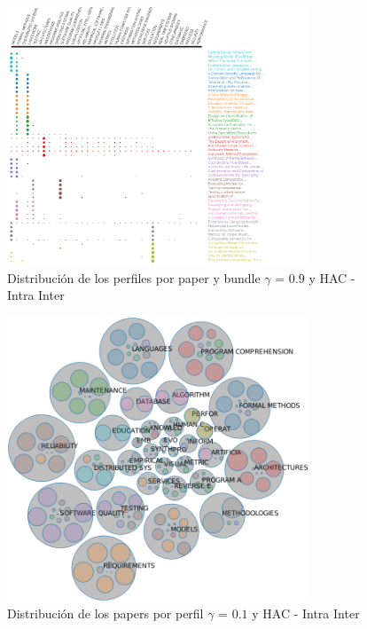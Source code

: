 \begin{figure}[H]
  \centering
    \includegraphics[width=0.8\textwidth]{resultados/papers/HAC/INTRA_INTER/gamma-09.png}
  \caption{Distribución de los perfiles por paper y bundle $\gamma$ = $0.9$ y HAC - Intra Inter}
  \label{res:img-papers-gamma09-hac-intra-inter}
\end{figure}

\begin{figure}[H]
  \centering
    \includegraphics[width=0.8\textwidth]{resultados/papers/HAC/INTRA_INTER/bubbles-gamma-01.png}
  \caption{Distribución de los papers por perfil $\gamma$ = $0.1$ y HAC - Intra Inter}
  \label{res:img-papers-bubbles-gamma01-hac-intra-inter}
\end{figure}

